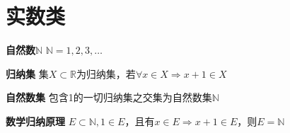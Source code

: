 \documentclass[11pt]{article}
\begin{document}
\section{实数类}
\textbf{自然数$\mathbb{N}$}
\newline
$\mathbb{N}={1,2,3,\dots}$
\newline

\textbf{归纳集}
\newline
集$X\subset\mathbb{R}$为归纳集，若$\forall x \in X \Rightarrow x+1 \in X$
\newline

\textbf{自然数集}
\newline
包含1的一切归纳集之交集为自然数集$\mathbb{N}$
\newline

\textbf{数学归纳原理}
\newline
$E \subset \mathbb{N}, 1 \in E$，且有$x \in E \Rightarrow x+1 \in E$，则$E=\mathbb{N}$
\newline
\end{document}
